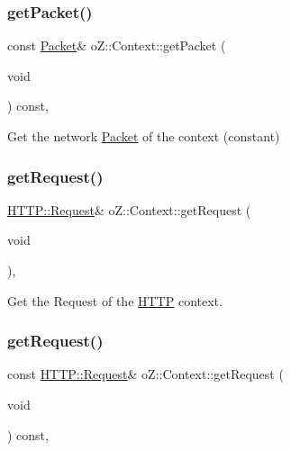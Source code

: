 \subsubsection{\texorpdfstring{getPacket()}{getPacket()}\hspace{0.1cm}{\footnotesize\ttfamily [2/2]}}
{\footnotesize\ttfamily const \mbox{\hyperlink{classo_z_1_1_packet}{Packet}}\& o\+Z\+::\+Context\+::get\+Packet (\begin{DoxyParamCaption}\item[{void}]{ }\end{DoxyParamCaption}) const\hspace{0.3cm}{\ttfamily [inline]}, {\ttfamily [noexcept]}}



Get the network \mbox{\hyperlink{classo_z_1_1_packet}{Packet}} of the context (constant) 

\mbox{\label{classo_z_1_1_context_af3d2d70a75f5f637a06ec5205e78758c}} 
\subsubsection{\texorpdfstring{getRequest()}{getRequest()}\hspace{0.1cm}{\footnotesize\ttfamily [1/2]}}
{\footnotesize\ttfamily \mbox{\hyperlink{classo_z_1_1_h_t_t_p_1_1_request}{H\+T\+T\+P\+::\+Request}}\& o\+Z\+::\+Context\+::get\+Request (\begin{DoxyParamCaption}\item[{void}]{ }\end{DoxyParamCaption})\hspace{0.3cm}{\ttfamily [inline]}, {\ttfamily [noexcept]}}



Get the Request of the \mbox{\hyperlink{namespaceo_z_1_1_h_t_t_p}{H\+T\+TP}} context. 

\mbox{\label{classo_z_1_1_context_afa1b9ec6afd21b7e620e7fe1f4c14e86}} 
\subsubsection{\texorpdfstring{getRequest()}{getRequest()}\hspace{0.1cm}{\footnotesize\ttfamily [2/2]}}
{\footnotesize\ttfamily const \mbox{\hyperlink{classo_z_1_1_h_t_t_p_1_1_request}{H\+T\+T\+P\+::\+Request}}\& o\+Z\+::\+Context\+::get\+Request (\begin{DoxyParamCaption}\item[{void}]{ }\end{DoxyParamCaption}) const\hspace{0.3cm}{\ttfamily [inline]}, {\ttfamily [noexcept]}}



